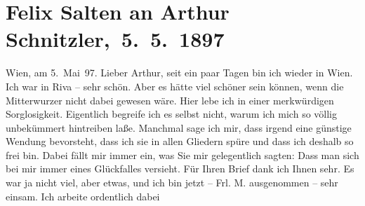 

         
         \renewcommand{\erwaehntePersonen}{Personen: Richard Beer-Hofmann, Otto Brahm, Julius von Gans-Ludassy, Georg Hirschfeld, Hugo von Hofmannsthal, Wilhelmine Mitterwurzer, Felix Salten, Ottilie Salten, Gustav Schwarzkopf}
         \renewcommand{\erwaehnteOrte}{Orte: London, Paris, Riva del Garda, Wien}
         \renewcommand{\erwaehnteWerke}{Werke: Agnes Jordan. Schauspiel in fünf Akten}
               \section[ Felix Salten an Arthur Schnitzler, 5. 5. 1897]{ Felix Salten an Arthur Schnitzler, 5. 5. 1897}\nopagebreak{}\rehead{ }\begin{ledgroupsized}[t]{13cm}\normalsize\beginnumbering{} \toendnotes[C]{\smallbreak\pagebreak[2]} 
\toendnotes[C]{\smallbreak}\pstart
           \raggedleft{}{\pb}Wien, am 5. Mai 97.\pend
           \pstart
           Lieber Arthur, seit ein paar Tagen bin ich wieder in Wien. Ich war in Riva – sehr schön. Aber es hätte viel schöner sein können, wenn die Mitterwurzer nicht dabei gewesen wäre. Hier lebe ich in einer
               merkwürdigen Sorglosigkeit. Eigentlich begreife ich es selbst nicht, warum ich mich
               so völlig unbekümmert hintreiben laße. Manchmal sage ich mir, dass irgend eine
               günstige Wendung bevorsteht, dass ich sie in allen Gliedern spüre und dass ich
               deshalb so frei bin. Dabei fällt mir immer ein, was Sie mir gelegentlich sagten: Dass
               man sich bei mir immer eines Glückfalles versieht. Für Ihren Brief dank ich Ihnen
               sehr. Es war ja nicht viel, aber etwas, und ich bin jetzt – Frl. M. ausgenommen – sehr einsam. Ich arbeite ordentlich dabei

\end{ledgroupsized}
